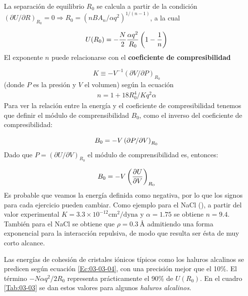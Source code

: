 La separación de equilibrio $R_0$ se calcula a partir  de la condición $(\partial U / \partial R)_{R_0} = 0 \Rightarrow R_0 = (nBA_n/\alpha q^2)^{1/(n-1)}$, a la cual

\begin{equation}
U(R_0) = - \frac{N}{2} \frac{\alpha q^2}{R_0} \left( 1-\frac{1}{n} \right) \label{Ec:03-03-04}
\end{equation}
El exponente $n$ puede relacionarse con el \textbf{coeficiente de compresibilidad} 

\begin{equation*}
	K\equiv - V^{-1}(\partial V / \partial P)_{R_0}
\end{equation*}
(donde $P$ es la presión y $V$ el volumen) según la ecuación
\begin{eqnarray}
	n=1+18R_0^4 / Kq^2 \alpha
\end{eqnarray}
Para ver la relación entre la energía y el coeficiente de compresibilidad tenemos que definir el módulo de comprensibilidad $B_0$, como el inverso del coeficiente de compresibilidad:

\begin{equation}
	B_0 = - V \left( \partial P / \partial V \right)_{R_0}
\end{equation}
Dado que $P=(\partial U / \partial V)_{R_0}$ el módulo de comprensibilidad es, entonces:

\begin{equation}
	B_0 =  - V \left( \frac{\partial U}{\partial V} \right)_{R_0}
\end{equation}
Es probable que veamos la energía definida como negativa, por lo que los signos para cada ejercicio pueden cambiar.  Como ejemplo para el NaCl (\fcc), a partir del valor experimental $K=3.3\times 10^{-12} \unit{\cm}^2 / \text{dyna}$ y $\alpha = 1.75$ se obtiene $n=9.4$. También para el NaCl se obtiene que $\rho=0.3 \ \unit{\angstrom}$ admitiendo una forma exponencial para la interacción repulsiva, de modo que resulta ser ésta de muy corto alcance.


Las energías de cohesión de cristales iónicos típicos como los haluros alcalinos se predicen según ecuación \ref{Ec:03-03-04}, con una precisión mejor que el 10\%. El término $-N\alpha q^2 / 2 R_0$ representa prácticamente el 90\% de $U(R_0)$. En el cuadro \ref{Tab:03-03} se dan estos valores para  algunos \textit{haluros alcalinos}.

